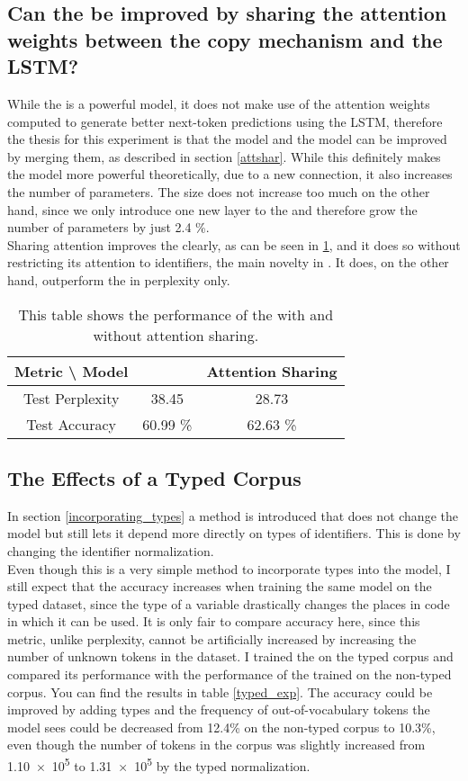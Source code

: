\documentclass[11pt]{article}
\begin{document}
\subsection{Can the \spn be improved by sharing the attention weights between the copy mechanism and the LSTM?}
\label{attshar_results}
While the \spn is a powerful model, it does not make use of the attention weights computed to generate better next-token predictions using the LSTM, therefore the thesis for this experiment is that the \spn model and the \lmatt model can be improved by merging them, as described in section \ref{attshar}. While this definitely makes the model more powerful theoretically, due to a new connection, it also increases the number of parameters. The size does not increase too much on the other hand, since we only introduce one new layer to the \spn and therefore grow the number of parameters by just 2.4 \%.\\
Sharing attention improves the \spn clearly, as can be seen in \ref{attshar_table}, and it does so without restricting its attention to identifiers, the main novelty in \cite{bhoopchand2016learning}. It does, on the other hand, outperform the \lmatt in perplexity only.
\begin{table}
\centering
	\begin{tabular}{c | c | c}
		Metric \textbackslash{} Model & \spn & Attention Sharing\\\hline
		Test Perplexity & 38.45 & 28.73	\\\hline
		Test Accuracy & 60.99 \% & 62.63 \%
	\end{tabular}
\label{attshar_table}
\caption{This table shows the performance of the \spn with and without attention sharing.}
\end{table}


\subsection{The Effects of a Typed Corpus}
In section \ref{incorporating_types} a method is introduced that does not change the model but still lets it depend more directly on types of identifiers. This is done by changing the identifier normalization.\\
Even though this is a very simple method to incorporate types into the model, I still expect that the accuracy increases when training the same model on the typed dataset, since the type of a variable drastically changes the places in code in which it can be used. It is only fair to compare accuracy here, since this metric, unlike perplexity, cannot be artificially increased by increasing the number of unknown tokens in the dataset. I trained the \spn on the typed corpus and compared its performance with the performance of the \spn trained on the non-typed corpus. You can find the results in table \ref{typed_exp}. The accuracy could be improved by adding types and the frequency of out-of-vocabulary tokens the model sees could be decreased from 12.4\% on the non-typed corpus to 10.3\%, even though the number of tokens in the corpus was slightly increased from \num{1.10e5} to \num{1.31e5} by the typed normalization.
\end{document}
